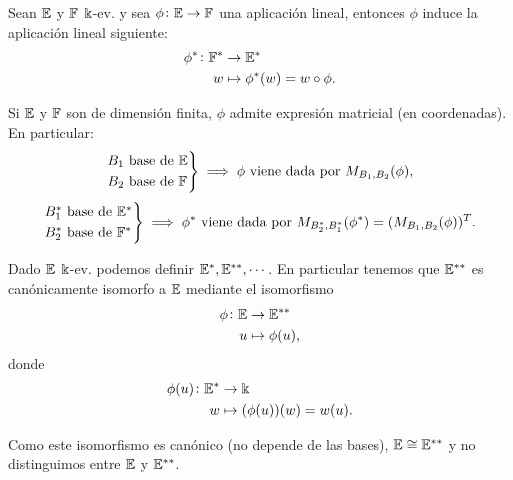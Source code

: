 \begin{prop}
    Sean $\mathbb{E}$ y $\mathbb{F}$ $\Bbbk$-ev. y sea $\phi \colon \mathbb{E} \to \mathbb{F}$ una
    aplicación lineal, entonces $\phi$ induce la aplicación
    lineal siguiente:
    \[
        \begin{aligned}
        \phi^* \colon \mathbb{F}^* &\to \mathbb{E}^*\\
        w &\mapsto \phi^*(w) = w \circ \phi.
        \end{aligned}
    \]
\end{prop}
\begin{obs}
    Si $\mathbb{E}$ y $\mathbb{F}$ son de dimensión finita, $\phi$ admite expresión
    matricial (en coordenadas). En particular:
    \[
        \displaystyle \begin{rcases} B_1 \text{ base de } \mathbb{E} \\ B_2
        \text{ base de } \mathbb{F} \end{rcases} \implies \phi \text{ viene dada por }
        M_{B_1,B_2}(\phi),
    \]
    \[
        \displaystyle \begin{rcases} B_1^*
        \text{ base de } \mathbb{E}^* \\ B_2^* \text{ base de } \mathbb{F}^*
        \end{rcases} \implies \phi^* \text{ viene dada por }
        M_{B_2^*,B_1^*}(\phi^*) = (M_{B_1,B_2}(\phi))^T.
    \]
\end{obs}
\begin{prop}
    Dado $\mathbb{E}$ $\Bbbk$-ev. podemos definir $\mathbb{E}^*,\mathbb{E}^{**},\cdots$. En
    particular tenemos que $\mathbb{E}^{**}$ es canónicamente isomorfo a
    $\mathbb{E}$ mediante el isomorfismo
    \[
        \begin{aligned}
            \phi \colon \mathbb{E} &\to \mathbb{E}^{**}\\
            u &\mapsto \phi(u),
        \end{aligned}
    \]
    donde
    \[
        \begin{aligned}
            \phi(u) \colon \mathbb{E}^* &\to \Bbbk \\
            w &\mapsto (\phi(u))(w) = w(u).
        \end{aligned}
    \]
\end{prop}
\begin{obs}
    Como este isomorfismo es canónico (no depende de las bases),
    $\mathbb{E} \cong \mathbb{E}^{**}$ y no distinguimos entre $\mathbb{E}$ y $\mathbb{E}^{**}$.
\end{obs}



